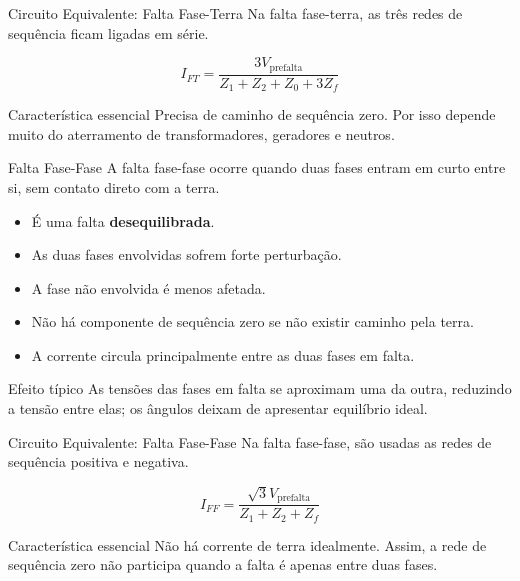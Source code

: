 \documentclass[aspectratio=169,11pt]{beamer}
\begin{document}
\begin{frame}{Circuito Equivalente: Falta Fase-Terra}
  Na falta fase-terra, as três redes de sequência ficam ligadas em série.

  \[
    I_{FT} = \frac{3V_{\text{prefalta}}}{Z_1 + Z_2 + Z_0 + 3Z_f}
  \]

  \begin{center}
  \end{center}

  \begin{block}{Característica essencial}
    Precisa de caminho de sequência zero. Por isso depende muito do aterramento de transformadores, geradores e neutros.
  \end{block}
\end{frame}

\begin{frame}{Falta Fase-Fase}
  A falta fase-fase ocorre quando duas fases entram em curto entre si, sem contato direto com a terra.

  \begin{itemize}
    \item É uma falta \textbf{desequilibrada}.
    \item As duas fases envolvidas sofrem forte perturbação.
    \item A fase não envolvida é menos afetada.
    \item Não há componente de sequência zero se não existir caminho pela terra.
    \item A corrente circula principalmente entre as duas fases em falta.
  \end{itemize}

  \begin{block}{Efeito típico}
    As tensões das fases em falta se aproximam uma da outra, reduzindo a tensão entre elas; os ângulos deixam de apresentar equilíbrio ideal.
  \end{block}
\end{frame}

\begin{frame}{Circuito Equivalente: Falta Fase-Fase}
  Na falta fase-fase, são usadas as redes de sequência positiva e negativa.

  \[
    I_{FF} = \frac{\sqrt{3}V_{\text{prefalta}}}{Z_1 + Z_2 + Z_f}
  \]

  \begin{center}
  \end{center}

  \begin{block}{Característica essencial}
    Não há corrente de terra idealmente. Assim, a rede de sequência zero não participa quando a falta é apenas entre duas fases.
  \end{block}
\end{frame}
\end{document}
